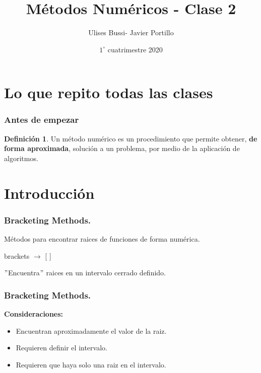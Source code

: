 \documentclass[xcolor=svgnames]{beamer} %
\title{Métodos Numéricos - Clase 2}
\author{Ulises Bussi- Javier Portillo}
\date{ $1^\circ$ cuatrimestre 2020}
\theoremstyle{plain}
\renewcommand{\textbf}[1]{{\bfseries\textcolor{redUnq2}{#1}}}
\theoremstyle{definition}
\newtheorem{defi}{Definición}
\begin{document}
 


\begin{frame} %
	\titlepage
\end{frame}

\section{Lo que repito todas las clases}
\begin{frame}
\frametitle{Antes de empezar}
\begin{tcolorbox}
	\begin{defi} \vspace{15pt}

		Un método numérico es un procedimiento que permite obtener, \textbf{de forma aproximada}, solución a un problema, por medio de la aplicación de algoritmos.
	\end{defi}
\end{tcolorbox}


\end{frame}

\section{Introducción}
\begin{frame}
\frametitle{Bracketing Methods.}

Métodos para encontrar raices de funciones de forma numérica.\vspace{10pt}


\begin{tcolorbox}
  \begin{center}
    brackets $\rightarrow$ [ ]
  \end{center}
\end{tcolorbox} \vspace{20pt}
\pause


$"$Encuentra$"$ raices en un intervalo cerrado definido.



\end{frame}

\begin{frame}
\frametitle{Bracketing Methods.}
\textbf{Consideraciones:}
\begin{itemize}
\item Encuentran aproximadamente el valor de la raiz.
\item Requieren definir el intervalo.
\item Requieren que haya solo una raiz en el intervalo.

\end{itemize}
\end{frame}
\end{document}
